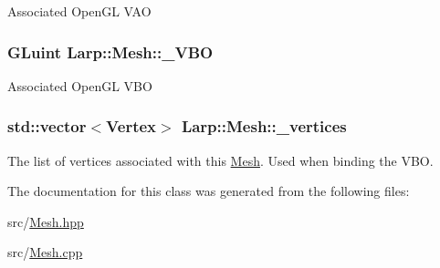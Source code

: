 Associated Open\-G\-L V\-A\-O \hypertarget{classLarp_1_1Mesh_a72ad2a0ac19c617fc9abc4f48fd99350}{
\subsubsection[{\-\_\-\-V\-B\-O}]{\setlength{\rightskip}{0pt plus 5cm}G\-Luint Larp\-::\-Mesh\-::\-\_\-\-V\-B\-O\hspace{0.3cm}{\ttfamily [private]}}}\label{classLarp_1_1Mesh_a72ad2a0ac19c617fc9abc4f48fd99350}
Associated Open\-G\-L V\-B\-O \hypertarget{classLarp_1_1Mesh_af77086ebadfb8b0f4fb3c2e5f39d6a43}{
\subsubsection[{\-\_\-vertices}]{\setlength{\rightskip}{0pt plus 5cm}std\-::vector$<${\bf Vertex}$>$ Larp\-::\-Mesh\-::\-\_\-vertices}}\label{classLarp_1_1Mesh_af77086ebadfb8b0f4fb3c2e5f39d6a43}
The list of vertices associated with this \hyperlink{classLarp_1_1Mesh}{Mesh}. Used when binding the V\-B\-O. 

The documentation for this class was generated from the following files\-:\begin{DoxyCompactItemize}
\item 
src/\hyperlink{Mesh_8hpp}{Mesh.\-hpp}\item 
src/\hyperlink{Mesh_8cpp}{Mesh.\-cpp}\end{DoxyCompactItemize}
